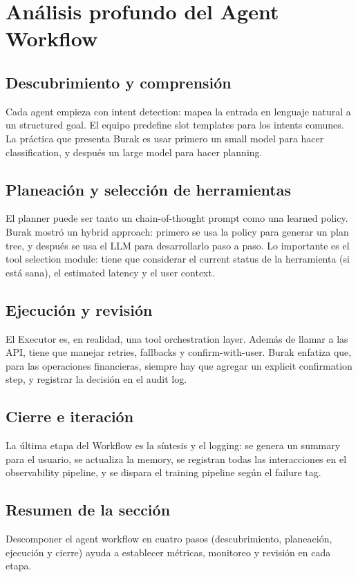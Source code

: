 \section{Análisis profundo del Agent Workflow}

\subsection{Descubrimiento y comprensión}

Cada agent empieza con intent detection: mapea la entrada en lenguaje natural a un structured goal. El equipo predefine slot templates para los intents comunes. La práctica que presenta Burak es usar primero un small model para hacer classification, y después un large model para hacer planning.

\subsection{Planeación y selección de herramientas}

El planner puede ser tanto un chain-of-thought prompt como una learned policy. Burak mostró un hybrid approach: primero se usa la policy para generar un plan tree, y después se usa el LLM para desarrollarlo paso a paso. Lo importante es el tool selection module: tiene que considerar el current status de la herramienta (si está sana), el estimated latency y el user context.

\subsection{Ejecución y revisión}

El Executor es, en realidad, una tool orchestration layer. Además de llamar a las API, tiene que manejar retries, fallbacks y confirm-with-user. Burak enfatiza que, para las operaciones financieras, siempre hay que agregar un explicit confirmation step, y registrar la decisión en el audit log.

\subsection{Cierre e iteración}

La última etapa del Workflow es la síntesis y el logging: se genera un summary para el usuario, se actualiza la memory, se registran todas las interacciones en el observability pipeline, y se dispara el training pipeline según el failure tag.

\subsection{Resumen de la sección}

Descomponer el agent workflow en cuatro pasos (descubrimiento, planeación, ejecución y cierre) ayuda a establecer métricas, monitoreo y revisión en cada etapa.
